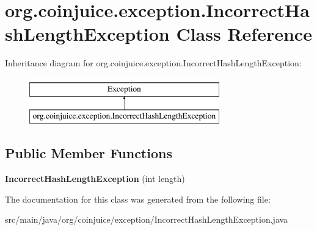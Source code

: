 \hypertarget{classorg_1_1coinjuice_1_1exception_1_1_incorrect_hash_length_exception}{\section{org.\-coinjuice.\-exception.\-Incorrect\-Hash\-Length\-Exception Class Reference}
\label{classorg_1_1coinjuice_1_1exception_1_1_incorrect_hash_length_exception}
}
Inheritance diagram for org.\-coinjuice.\-exception.\-Incorrect\-Hash\-Length\-Exception\-:\begin{figure}[H]
\begin{center}
\leavevmode
\includegraphics[height=2.000000cm]{classorg_1_1coinjuice_1_1exception_1_1_incorrect_hash_length_exception}
\end{center}
\end{figure}
\subsection*{Public Member Functions}
\begin{DoxyCompactItemize}
\item 
\hypertarget{classorg_1_1coinjuice_1_1exception_1_1_incorrect_hash_length_exception_a85b75cc9d3a1d802a8f4956a644275be}{{\bfseries Incorrect\-Hash\-Length\-Exception} (int length)}\label{classorg_1_1coinjuice_1_1exception_1_1_incorrect_hash_length_exception_a85b75cc9d3a1d802a8f4956a644275be}

\end{DoxyCompactItemize}


The documentation for this class was generated from the following file\-:\begin{DoxyCompactItemize}
\item 
src/main/java/org/coinjuice/exception/Incorrect\-Hash\-Length\-Exception.\-java\end{DoxyCompactItemize}
